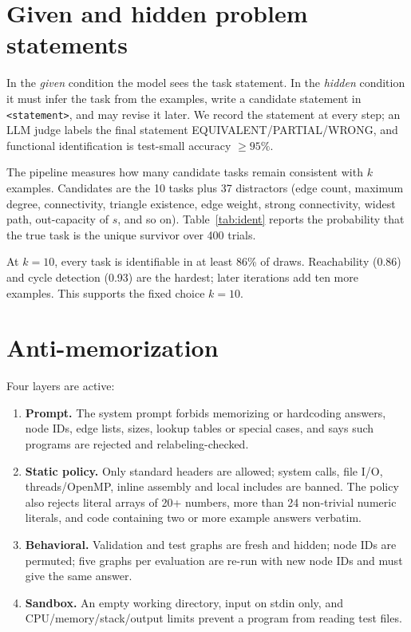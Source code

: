 \documentclass[11pt]{article}
\begin{document}
\section{Given and hidden problem statements}
\label{sec:ident}

In the \emph{given} condition the model sees the task statement. In the
\emph{hidden} condition it must infer the task from the examples, write a
candidate statement in \texttt{<statement>}, and may revise it later. We record
the statement at every step; an LLM judge labels the final statement
EQUIVALENT/PARTIAL/WRONG, and functional identification is test-small accuracy
$\ge95\%$.

The pipeline measures how many candidate tasks remain consistent with $k$
examples. Candidates are the 10 tasks plus 37 distractors (edge count, maximum
degree, connectivity, triangle existence, edge weight, strong connectivity,
widest path, out-capacity of $s$, and so on). Table~\ref{tab:ident} reports the
probability that the true task is the unique survivor over 400 trials.

\begin{table}[h]
\centering
\small

\caption{Probability that the true task is the unique survivor among 10 tasks
and 37 distractors, and the main confusers at $k=3$ (400 trials).}
\label{tab:ident}
\end{table}

At $k=10$, every task is identifiable in at least 86\% of draws. Reachability
(0.86) and cycle detection (0.93) are the hardest; later iterations add ten more
examples. This supports the fixed choice $k=10$.

\section{Anti-memorization}

Four layers are active:

\begin{enumerate}[leftmargin=1.4em]
\item \textbf{Prompt.} The system prompt forbids memorizing or hardcoding
answers, node IDs, edge lists, sizes, lookup tables or special cases, and says
such programs are rejected and relabeling-checked.
\item \textbf{Static policy.} Only standard headers are allowed; system calls,
file I/O, threads/OpenMP, inline assembly and local includes are banned. The
policy also rejects literal arrays of 20+ numbers, more than 24 non-trivial
numeric literals, and code containing two or more example answers verbatim.
\item \textbf{Behavioral.} Validation and test graphs are fresh and hidden; node
IDs are permuted; five graphs per evaluation are re-run with new node IDs and
must give the same answer.
\item \textbf{Sandbox.} An empty working directory, input on stdin only, and
CPU/memory/stack/output limits prevent a program from reading test files.
\end{enumerate}
\end{document}
